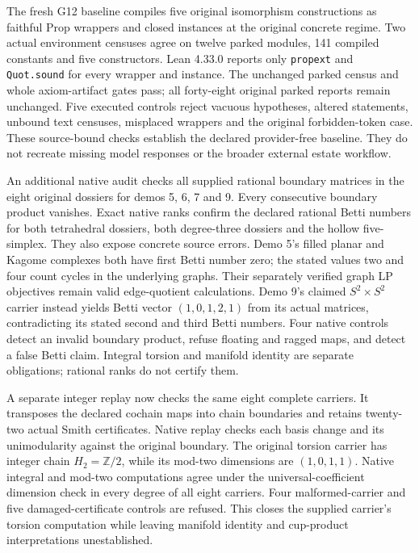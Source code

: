 \documentclass[
  11pt,
]{article}
\begin{document}
The fresh G12 baseline compiles five original isomorphism constructions
as faithful Prop wrappers and closed instances at the original concrete
regime. Two actual environment censuses agree on twelve parked modules,
141 compiled constants and five constructors. Lean 4.33.0 reports only
\texttt{propext} and \texttt{Quot.sound} for every wrapper and instance.
The unchanged parked census and whole axiom-artifact gates pass; all
forty-eight original parked reports remain unchanged. Five executed
controls reject vacuous hypotheses, altered statements, unbound text
censuses, misplaced wrappers and the original forbidden-token case.
These source-bound checks establish the declared provider-free baseline.
They do not recreate missing model responses or the broader external
estate workflow.

An additional native audit checks all supplied rational boundary
matrices in the eight original dossiers for demos 5, 6, 7 and 9. Every
consecutive boundary product vanishes. Exact native ranks confirm the
declared rational Betti numbers for both tetrahedral dossiers, both
degree-three dossiers and the hollow five-simplex. They also expose
concrete source errors. Demo 5's filled planar and Kagome complexes both
have first Betti number zero; the stated values two and four count
cycles in the underlying graphs. Their separately verified graph LP
objectives remain valid edge-quotient calculations. Demo 9's claimed
\(S^2\times S^2\) carrier instead yields Betti vector \((1,0,1,2,1)\)
from its actual matrices, contradicting its stated second and third
Betti numbers. Four native controls detect an invalid boundary product,
refuse floating and ragged maps, and detect a false Betti claim.
Integral torsion and manifold identity are separate obligations;
rational ranks do not certify them.

A separate integer replay now checks the same eight complete carriers.
It transposes the declared cochain maps into chain boundaries and
retains twenty-two actual Smith certificates. Native replay checks each
basis change and its unimodularity against the original boundary. The
original torsion carrier has integer chain \(H_2=\mathbb Z/2\), while
its mod-two dimensions are \((1,0,1,1)\). Native integral and mod-two
computations agree under the universal-coefficient dimension check in
every degree of all eight carriers. Four malformed-carrier and five
damaged-certificate controls are refused. This closes the supplied
carrier's torsion computation while leaving manifold identity and
cup-product interpretations unestablished.
\end{document}
